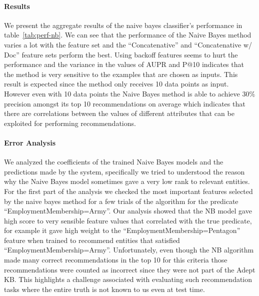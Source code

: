 \documentclass[paper=a4,fontsize=11pt]{scrartcl}
\newcommand{\tabref}[1]{table~\ref{#1}}
\numberwithin{equation}{section}    %
\numberwithin{figure}{section}      %
\numberwithin{table}{section}       %
\begin{document}
\paragraph{Results} We present the aggregate results of the naive bayes classifier's performance in \tabref{tab:perf-nb}.
We can see that the performance of the Naive Bayes method varies a lot with the feature set
and the ``Concatenative'' and ``Concatenative w/ Doc'' feature sets perform the best.
Using backoff features seems to hurt the performance and
the variance in the values of AUPR and P@10 indicates that the method is very sensitive to
the examples that are chosen as inputs. This result is expected since the method only receives 10 data points as input.
However even with 10 data points the Naive Bayes method is able to achieve $30\%$ precision amongst its top 10
recommendations on average which indicates that there are correlations between the values of different attributes
that can be exploited for performing recommendations.

\begin{table}[htbp]
  \centering
  \caption{Performance(\%) with NB with 90\% confidence intervals.}
  \label{tab:perf-nb}
\end{table}

\paragraph{Error Analysis}
We analyzed the coefficients of the trained Naive Bayes models and the predictions made by the system, specifically we tried to understood the reason why the Naive Bayes model sometimes gave a very low rank to relevant entities.
For the first part of the analysis we checked the most important features selected by the naive bayes method for
a few trials of the algorithm for the predicate ``EmploymentMembership=Army''.
Our analysis showed that the NB model gave high score to very sensible feature
values that correlated with the true predicate, for example it gave high weight to the ``EmploymentMembership=Pentagon''
feature when trained to recommend entities that satisfied ``EmploymentMembership=Army''.
Unfortunately, even though the NB algorithm made many correct
recommendations in the top 10 for this criteria those recommendations were
counted as incorrect since they were not part of the Adept KB. This highlights a
challenge associated with evaluating such recommendation tasks where the entire
truth is not known to us even at test time.
\end{document}
